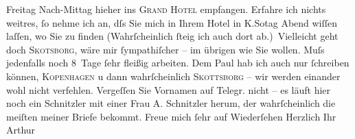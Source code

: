                  Freitag{ }\introOben{}Nach-\introOben{}Mittag hieher ins \textsc{Grand Hotel} empfangen. Erfahre ich nichts weitres,{ }ſo nehme ich an, dſs Sie mich in Ihrem
               Hotel in K.So{\geminationn}tag Abend wiſſen laſſen, wo Sie zu
               finden (Wahrſcheinlich{ }ſteig ich {\pb}auch dort
               ab.) Vielleicht geht doch \textsc{Skotsborg}, wäre mir{ }ſympathiſcher – im übrigen wie Sie wollen. Muſs jedenfalls noch
               8 Tage{ }ſehr fleißig arbeiten. Dem Paul hab ich
               auch nur{ }ſchreiben können, \textsc{Kopenhagen} u dann wahrſcheinlich \textsc{Skottsborg} – wir werden einander wohl nicht verfehlen. Vergeſſen Sie Vornamen auf Telegr.
               nicht – es läuft hier noch ein Schnitzler mit
               einer Frau A. Schnitzler herum, der
               wahrſcheinlich die meiſten meiner Briefe bekommt. Freue mich{ }ſehr auf Wiederſehen\pend
           \pstart Herzlich Ihr \spacefill\mbox{Arthur}\pend{}\endnumbering{}  \newcommand{\dateiname}{L00571}\newcommand{\titel}{Arthur Schnitzler an Richard Beer-Hofmann, 29. 7. 1896}\newcommand{\editorInnen}{Martin Anton Müller und Gerd-Hermann Susen}

